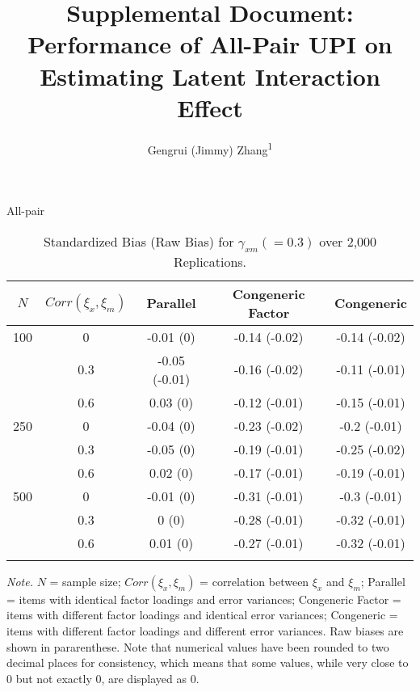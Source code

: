 \documentclass[
  man, donotrepeattitle]{apa6}
\title{Supplemental Document: Performance of All-Pair UPI on Estimating Latent Interaction Effect}
\author{Gengrui (Jimmy) Zhang\textsuperscript{1}}
\date{}
\affiliation{\vspace{0.5cm}\textsuperscript{1} University of Southhern California}
\begin{document}
\maketitle

All-pair

\begin{table}[tbp]

\begin{center}
\begin{threeparttable}

\caption{\label{tab:standardized bias (raw bias)}Standardized Bias (Raw Bias) for $\gamma_{xm} (= 0.3)$ over 2,000 Replications.}

\begin{tabular}{ccccc}
\toprule
$\textit{N}$ & \multicolumn{1}{c}{$Corr(\xi_{x}, \xi_{m})$} & \multicolumn{1}{c}{Parallel} & \multicolumn{1}{c}{Congeneric Factor} & \multicolumn{1}{c}{Congeneric}\\
\midrule
100 & 0 & -0.01 (0) & -0.14 (-0.02) & -0.14 (-0.02)\\
 & 0.3 & -0.05 (-0.01) & -0.16 (-0.02) & -0.11 (-0.01)\\
 & 0.6 & 0.03 (0) & -0.12 (-0.01) & -0.15 (-0.01)\\
250 & 0 & -0.04 (0) & -0.23 (-0.02) & -0.2 (-0.01)\\
 & 0.3 & -0.05 (0) & -0.19 (-0.01) & -0.25 (-0.02)\\
 & 0.6 & 0.02 (0) & -0.17 (-0.01) & -0.19 (-0.01)\\
500 & 0 & -0.01 (0) & -0.31 (-0.01) & -0.3 (-0.01)\\
 & 0.3 & 0 (0) & -0.28 (-0.01) & -0.32 (-0.01)\\
 & 0.6 & 0.01 (0) & -0.27 (-0.01) & -0.32 (-0.01)\\
\bottomrule
\addlinespace
\end{tabular}

\begin{tablenotes}[para]
\normalsize{\textit{Note.} $\textit{N}$ = sample size; $Corr(\xi_{x}, \xi_{m})$ = correlation between $\xi_{x}$ and $\xi_{m}$; Parallel = items with identical factor loadings and error variances; Congeneric Factor = items with different factor loadings and identical error variances; Congeneric = items with different factor loadings and different error variances. Raw biases are shown in pararenthese. Note that numerical values have been rounded to two decimal places for consistency, which means that some values, while very close to 0 but not exactly 0, are displayed as 0.}
\end{tablenotes}

\end{threeparttable}
\end{center}

\end{table}
\end{document}
